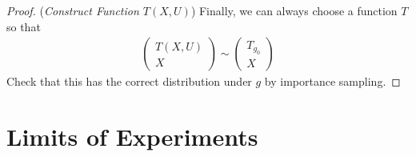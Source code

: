\documentclass[12pt]{article}
\theoremstyle{plain}
\theoremstyle{definition}
\newtheorem{defn}[thm]{Definition}
\theoremstyle{remark}
\newcommand{\dto}{\xrightarrow{d}}
\begin{document}
\begin{proof}
(\emph{Construct Function $T(X,U)$})
Finally, we can always choose a function $T$ so that
\begin{align*}
  \begin{pmatrix}
    T(X,U) \\ X
  \end{pmatrix}
  \sim
  \begin{pmatrix}
    T_{g_0} \\ X
  \end{pmatrix}
\end{align*}
Check that this has the correct distribution under $g$ by importance
sampling.


\end{proof}







\clearpage
\section{Limits of Experiments}
\end{document}
